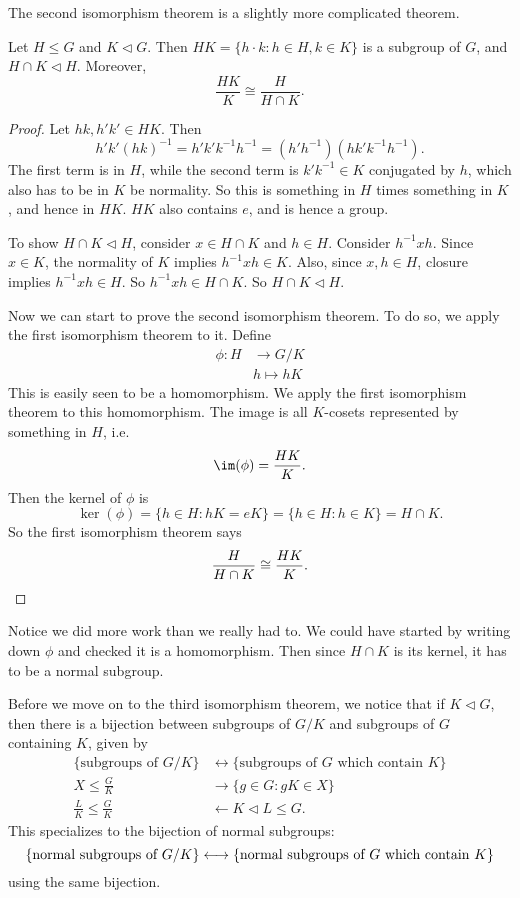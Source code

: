 \documentclass[a4paper]{article}
\begin{document}
The second isomorphism theorem is a slightly more complicated theorem.
\begin{thm}
  Let $H \leq G$ and $K \lhd G$. Then $HK = \{h\cdot k: h \in H, k \in K\}$ is a subgroup of $G$, and $H\cap K \lhd H$. Moreover,
  \[
    \frac{HK}{K} \cong \frac{H}{H \cap K}.
  \]
\end{thm}

\begin{proof}
  Let $hk, h'k' \in HK$. Then
  \[
    h'k'(hk)^{-1} = h'k' k^{-1}h^{-1} = (h'h^{-1})(hk'k^{-1}h^{-1}).
  \]
  The first term is in $H$, while the second term is $k'k^{-1} \in K$ conjugated by $h$, which also has to be in $K$ be normality. So this is something in $H$ times something in $K$, and hence in $HK$. $HK$ also contains $e$, and is hence a group.

  To show $H \cap K \lhd H$, consider $x \in H\cap K$ and $h \in H$. Consider $h^{-1} x h$. Since $x \in K$, the normality of $K$ implies $h^{-1}xh \in K$. Also, since $x, h \in H$, closure implies $h^{-1}xh \in H$. So $h^{-1} x h \in H \cap K$. So $H \cap K \lhd H$.

  Now we can start to prove the second isomorphism theorem. To do so, we apply the first isomorphism theorem to it. Define
  \begin{align*}
    \phi: H &\to G/K\\
    &h \mapsto hK
  \end{align*}
  This is easily seen to be a homomorphism. We apply the first isomorphism theorem to this homomorphism. The image is all $K$-cosets represented by something in $H$, i.e.
  \[
    \im (\phi) = \frac{HK}{K}.
  \]
  Then the kernel of $\phi$ is
  \[
    \ker(\phi) = \{h \in H : hK = eK\} = \{h \in H : h \in K\} = H \cap K.
  \]
  So the first isomorphism theorem says
  \[
    \frac{H}{H \cap K} \cong \frac{HK}{K}.\qedhere
  \]
\end{proof}
Notice we did more work than we really had to. We could have started by writing down $\phi$ and checked it is a homomorphism. Then since $H \cap K$ is its kernel, it has to be a normal subgroup.

Before we move on to the third isomorphism theorem, we notice that if $K \lhd G$, then there is a bijection between subgroups of $G/K$ and subgroups of $G$ containing $K$, given by
\begin{align*}
  \{\text{subgroups of }G/K\} &\longleftrightarrow\{\text{subgroups of }G\text{ which contain }K\}\\
  X \leq \frac{G}{K} &\longrightarrow \{g \in G: gK \in X\}\\
  \frac{L}{K} \leq \frac{G}{K} &\longleftarrow K \lhd L \leq G.
\end{align*}
This specializes to the bijection of normal subgroups:
\[
  \{\text{normal subgroups of }G/K\} \longleftrightarrow\{\text{normal subgroups of }G\text{ which contain }K\}\\
\]
using the same bijection.
\end{document}
